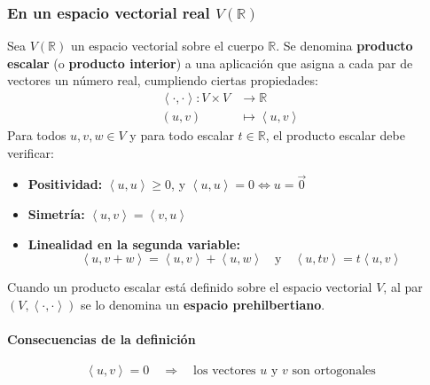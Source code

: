 \subsubsection{En un espacio vectorial real \(V(\mathbb{R})\)}

Sea \(V(\mathbb{R})\) un espacio vectorial sobre el cuerpo \(\mathbb{R}\). Se denomina \textbf{producto escalar} (o \textbf{producto interior}) a una aplicación que asigna a cada par de vectores un número real, cumpliendo ciertas propiedades:
\begin{align*}
  \left\langle \cdot, \cdot \right\rangle : V \times V &\longrightarrow \mathbb{R} \\
  (u,v) &\longmapsto \left\langle u, v \right\rangle
\end{align*}
Para todos \(u, v, w \in V\) y para todo escalar \(t \in \mathbb{R}\), el producto escalar debe verificar:

\begin{itemize}
  \item \textbf{Positividad:} \(\left\langle u, u \right\rangle \geq 0\), y \(\left\langle u, u \right\rangle = 0 \iff u = \vec{0}\)
  \item \textbf{Simetría:} \(\left\langle u, v \right\rangle = \left\langle v, u \right\rangle\)
  \item \textbf{Linealidad en la segunda variable:}
  \[
    \left\langle u, v + w \right\rangle = \left\langle u, v \right\rangle + \left\langle u, w \right\rangle
    \quad \text{y} \quad
    \left\langle u, t v \right\rangle = t \left\langle u, v \right\rangle
  \]
\end{itemize}

Cuando un producto escalar está definido sobre el espacio vectorial \(V\), al par \(\left(V, \left\langle \cdot, \cdot \right\rangle\right)\) se lo denomina un \textbf{espacio prehilbertiano}.

\paragraph{Consecuencias de la definición}
\[
\left\langle u, v \right\rangle = 0 \quad \Rightarrow \quad \text{los vectores \(u\) y \(v\) son ortogonales}
\]


